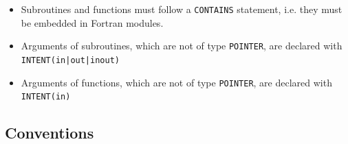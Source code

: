 \documentclass[a4paper,11pt,DIV16,BCOR1cm,titlepage]{scrartcl}
\begin{document}
\begin{itemize}
\begin{itemize}
\item Subroutines and functions must follow a \texttt{CONTAINS} statement, i.e. they must be embedded in Fortran modules.
\item Arguments of subroutines, which are not of type \texttt{POINTER}, are declared with \\
  \texttt{INTENT(in|out|inout)}
\item Arguments of functions, which are not of type \texttt{POINTER}, are declared with 
\texttt{INTENT(in)}
\end{itemize}
 
\end{itemize}

%
\subsection{Conventions}  
\end{document}
